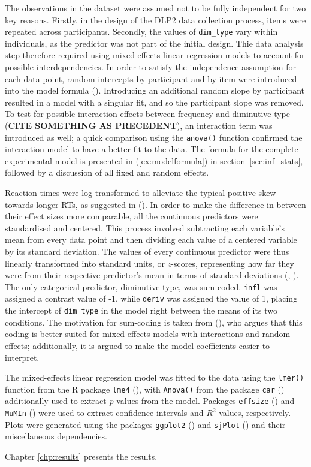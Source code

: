  The observations in the dataset were assumed not to be fully independent for two key reasons.  Firstly, in the design of the DLP2 data collection process, items were repeated across participants. Secondly, the values of \texttt{dim\_type} vary within individuals, as the predictor was not part of the initial design. Thie data analysis step therefore required using mixed-effects linear regression models to account for possible interdependencies. In order to satisfy the independence assumption for each data point, random intercepts by participant and by item were introduced into the model formula (\cite{Winter+2019}). Introducing an additional random slope by participant resulted in a model with a singular fit, and so the participant slope was removed. To test for possible interaction effects between frequency and diminutive type (\textbf{CITE SOMETHING AS PRECEDENT}), an interaction term was introduced as well; a quick comparison using the \texttt{anova()} function confirmed the interaction model to have a better fit to the data. The formula for the complete experimental model is presented in (\ref{ex:modelformula}) in section~\ref{sec:inf_stats}, followed by a discussion of all fixed and random effects.

Reaction times were log-transformed to alleviate the typical positive skew towards longer RTs, as suggested in \citeauthor{Winter+2019} (\citeyear{Winter+2019}). In order to make the difference in-between their effect sizes more comparable, all the continuous predictors were standardised and centered. This process involved subtracting each variable's mean from every data point and then dividing each value of a centered variable by its standard deviation. The values of every continuous predictor were thus linearly transformed into standard units, or \textit{z}-scores, representing how far they were from their respective predictor's mean in terms of standard deviations (\citeauthor{Winter+2019}, \citeyear{Winter+2019}). The only categorical predictor, diminutive type, was sum-coded. \texttt{infl} was assigned a contrast value of -1, while \texttt{deriv} was assigned the value of 1, placing the intercept of \texttt{dim\_type} in the model right between the means of its two conditions. The motivation for sum-coding is taken from \citeauthor{Winter+2019} (\citeyear{Winter+2019}), who argues that this coding is better suited for mixed-effects models with interactions and random effects; additionally, it is argued to make the model coefficients easier to interpret.

The mixed-effects linear regression model was fitted to the data using the \texttt{lmer()} function from the R package \texttt{lme4} (\cite{lme4+2015}), with \texttt{Anova()} from the package \texttt{car} (\cite{car+2019}) additionally used to extract \textit{p}-values from the model. Packages \texttt{effsize} (\cite{effsize+2020}) and \texttt{MuMIn} (\cite{MuMIn+2022}) were used to extract confidence intervals and $R^2$-values, respectively. Plots were generated using the packages \texttt{ggplot2} (\cite{ggplot2+2016}) and \texttt{sjPlot} (\cite{sjplot+2022}) and their miscellaneous dependencies.

Chapter \ref{chp:results} presents the results.